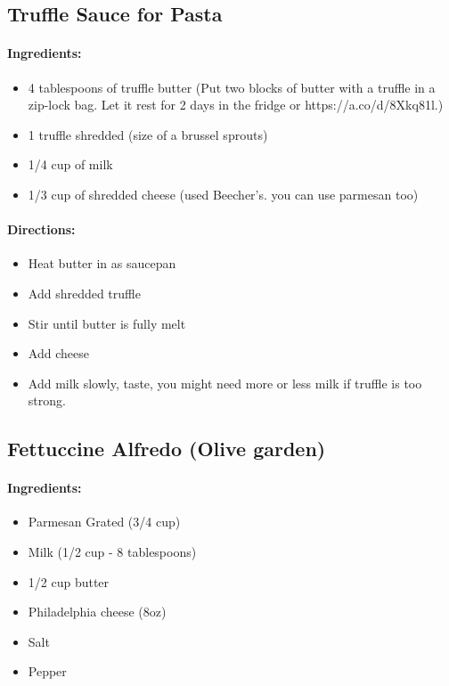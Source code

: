 \documentclass{article}
\begin{document}
\subsection{Truffle Sauce for Pasta}

\paragraph{Ingredients:}
\begin{itemize}
    \item 4 tablespoons of truffle butter (Put two blocks of butter with a truffle in a zip-lock bag. Let it rest for 2 days in the fridge or https://a.co/d/8Xkq81l.)
    \item 1 truffle shredded (size of a brussel sprouts)
    \item 1/4 cup of milk
    \item 1/3 cup of shredded cheese (used Beecher's. you can use parmesan too)
\end{itemize}

\paragraph{Directions:}
\begin{itemize}
    \item Heat butter in as saucepan
    \item Add shredded truffle
    \item Stir until butter is fully melt
    \item Add cheese
    \item Add milk slowly, taste, you might need more or less milk if truffle is too strong.
\end{itemize}

\subsection{Fettuccine Alfredo (Olive garden)}

\paragraph{Ingredients:}
\begin{itemize}
    \item Parmesan Grated (3/4 cup)
    \item Milk (1/2 cup - 8 tablespoons)
    \item 1/2 cup butter
    \item Philadelphia cheese (8oz)
    \item Salt
    \item Pepper
\end{itemize}
\end{document}
